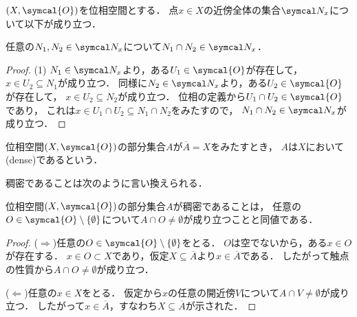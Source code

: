 \documentclass{ltjsbook}
\begin{document}
\begin{thmbox}
\begin{proposition}
\(\tuple{X, \symcal{O}}\)を位相空間とする．
点\(x \in X\)の近傍全体の集合\(\Neighborhood{x}\)について以下が成り立つ．
\begin{conditions}
    \item\label{neighborhood-cap} 任意の\(N_1, N_2 \in \Neighborhood{x}\)について\(N_1 \cap N_2 \in \Neighborhood{x}\)．
\end{conditions}
\end{proposition}
\end{thmbox}

\begin{proof} (1) \(N_1 \in \Neighborhood{x}\)より，ある\(U_1 \in \symcal{O}\)が存在して，
\(x \in U_2 \subseteq N_1\)が成り立つ．
同様に\(N_2 \in \Neighborhood{x}\)より，ある\(U_2 \in \symcal{O}\)が存在して，
\(x \in U_2 \subseteq N_2\)が成り立つ．
位相の定義から\(U_1 \cap U_2 \in \symcal{O}\)であり，
これは\(x \in U_1 \cap U_2 \subseteq N_1 \cap N_2\)をみたすので，
\(N_1 \cap N_2 \in \Neighborhood{x}\)が成り立つ．
\end{proof}

\begin{thmbox}
\begin{definition}
位相空間\(\tuple{X, \symcal{O}}\)の部分集合\(A\)が\(\overline{A} = X\)をみたすとき，
\(A\)は\(X\)において(dense)であるという．
\end{definition}
\end{thmbox}

稠密であることは次のように言い換えられる．

\begin{thmbox}
\begin{proposition}
位相空間\(\tuple{X, \symcal{O}}\)の部分集合\(A\)が稠密であることは，
任意の\(O \in \symcal{O} \setminus \{\emptyset\}\)について\(A \cap O \neq \emptyset\)が成り立つことと同値である．
\end{proposition}
\end{thmbox}

\begin{proof}(\(\Rightarrow\))任意の\(O \in \symcal{O} \setminus \{\emptyset\}\)をとる．
\(O\)は空でないから，ある\(x \in O\)が存在する．
\(x \in O \subset X\)であり，仮定\(X \subseteq \overline{A}\)より\(x \in \overline{A}\)である．
したがって触点の性質から\(A \cap O \neq \emptyset\)が成り立つ．

\noindent (\(\Leftarrow\))任意の\(x \in X\)をとる．
仮定から\(x\)の任意の開近傍\(V\)について\(A \cap V \neq \emptyset\)が成り立つ．
したがって\(x \in \overline{A}\)，すなわち\(X \subseteq \overline{A}\)が示された．
\end{proof}
\end{document}
